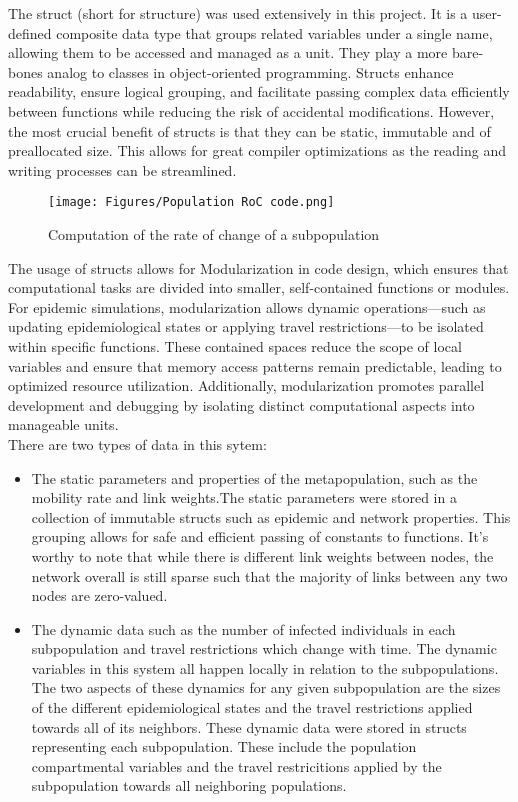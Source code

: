 The struct (short for structure) was used extensively in this project. It is a user-defined composite data type that groups related variables under a single name, allowing them to be accessed and managed as a unit. They play a more bare-bones analog to classes in object-oriented programming. Structs enhance readability, ensure logical grouping, and facilitate passing complex data efficiently between functions while reducing the risk of accidental modifications. However, the most crucial benefit of structs is that they can be static, immutable and of preallocated size. This allows for great compiler optimizations as the reading and writing processes can be streamlined.\\

\begin{figure}
	\centering
	\texttt{[image: Figures/Population RoC code.png]}
	\caption{\small Computation of the rate of change of a subpopulation}
\end{figure}
The usage of structs allows for Modularization in code design, which ensures that computational tasks are divided into smaller, self-contained functions or modules. For epidemic simulations, modularization allows dynamic operations—such as updating epidemiological states or applying travel restrictions—to be isolated within specific functions. These contained spaces reduce the scope of local variables and ensure that memory access patterns remain predictable, leading to optimized resource utilization. Additionally, modularization promotes parallel development and debugging by isolating distinct computational aspects into manageable units.\\

There are two types of data in this sytem: 
\begin{itemize}
	\item The static parameters and properties of the metapopulation, such as the mobility rate and link weights.The static parameters were stored in a collection of immutable structs such as epidemic and network properties. This grouping allows for safe and efficient passing of constants to functions. It's worthy to note that while there is different link weights between nodes, the network overall is still sparse such that the majority of links between any two nodes are zero-valued.
	\item The dynamic data such as the number of infected individuals in each subpopulation and travel restrictions which change with time. The dynamic variables in this system all happen locally in relation to the subpopulations. The two aspects of these dynamics for any given subpopulation are the sizes of the different epidemiological states and the travel restrictions applied towards all of its neighbors. These dynamic data were stored in structs representing each subpopulation. These include the population compartmental variables and the travel restricitions applied by the subpopulation towards all neighboring populations.
\end{itemize}

